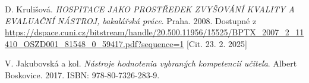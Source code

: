 \begin{thebibliography}{99}
 D. Krulišová. \emph{HOSPITACE JAKO PROSTŘEDEK ZVYŠOVÁNÍ KVALITY A EVALUAČNÍ NÁSTROJ, bakalářská práce}. Praha. 2008. Dostupné z \url{https://dspace.cuni.cz/bitstream/handle/20.500.11956/15525/BPTX_2007_2_11410_OSZD001_81548_0_59417.pdf?sequence=1} [Cit. 23. 2. 2025]



 V. Jakubovská a kol. \emph{Nástroje hodnotenia vybraných kompetencií učiteľa}. Albert Boskovice. 2017. ISBN: 978-80-7326-283-9. 



\end{thebibliography}

